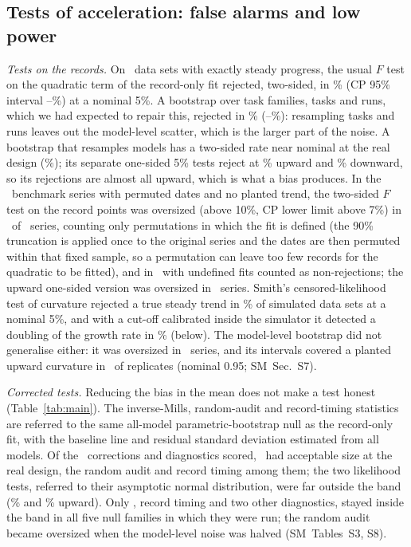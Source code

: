 \documentclass[aps,pre,twocolumn,superscriptaddress,nofootinbib,10pt]{revtex4-2}
\newcommand{\SM}{SM}
\begin{document}
\subsection{Tests of acceleration: false alarms and low power}\label{sec:size}\label{sec:power}
\emph{Tests on the records.} On \origIidN\ data sets with exactly steady progress, the usual $F$ test on the quadratic term of the record-only fit rejected, two-sided, in \origIid\% (CP 95\% interval \origIidLo--\origIidHi\%) at a nominal 5\%. A bootstrap over task families, tasks and runs, which we had expected to repair this, rejected in \origHb\% (\origHbLo--\origHbHi\%): resampling tasks and runs leaves out the model-level scatter, which is the larger part of the noise. A bootstrap that resamples models has a two-sided rate near nominal at the real design (\aTwoMbSotaTwoX\%); its separate one-sided 5\% tests reject at \aTwoMbSotaUpX\% upward and \aTwoMbSotaDnX\% downward, so its rejections are almost all upward, which is what a bias produces. In the \mbN\ benchmark series with permuted dates and no planted trend, the two-sided $F$ test on the record points was oversized (above 10\%, CP lower limit above 7\%) in \mbBarOne\ of \mbN\ series, counting only permutations in which the fit is defined (the 90\% truncation is applied once to the original series and the dates are then permuted within that fixed sample, so a permutation can leave too few records for the quadratic to be fitted), and in \mbIidTwoOverAtt\ with undefined fits counted as non-rejections; the upward one-sided version was oversized in \mbIidOneOver\ series. Smith's censored-likelihood test of curvature rejected a true steady trend in \sizeCclUp\% of simulated data sets at a nominal 5\%, and with a cut-off calibrated inside the simulator it detected a doubling of the growth rate in \powMaxTwo\% (below). The model-level bootstrap did not generalise either: it was oversized in \mbOver\ series, and its intervals covered a planted upward curvature in \mbCovPlus\ of replicates (nominal 0.95; \SM\ Sec.~S7).

\emph{Corrected tests.} Reducing the bias in the mean does not make a test honest (Table~\ref{tab:main}). The inverse-Mills, random-audit and record-timing statistics are referred to the same all-model parametric-bootstrap null as the record-only fit, with the baseline line and residual standard deviation estimated from all models. Of the \nMethods\ corrections and diagnostics scored, \nSizeValid\ had acceptable size at the real design, the random audit and record timing among them; the two likelihood tests, referred to their asymptotic normal distribution, were far outside the band (\sizeCclUp\% and \sizeTclUp\% upward). Only \nRobust, record timing and two other diagnostics, stayed inside the band in all five null families in which they were run; the random audit became oversized when the model-level noise was halved (\SM\ Tables~S3, S8).
\end{document}
